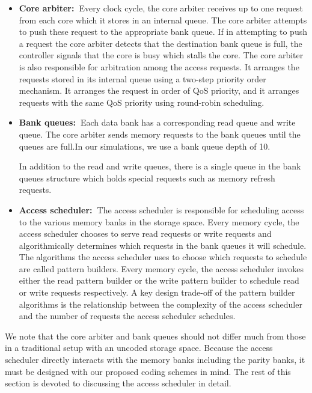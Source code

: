 \begin{itemize}
\item \textbf{Core arbiter:~}Every clock cycle, the core arbiter receives up to one request from each core which it stores in an internal queue. The core arbiter attempts to push these request to the appropriate bank queue. If in attempting to push a request the core arbiter detects that the destination bank queue is full, the controller signals that the core is busy which stalls the core. The core arbiter is also responsible for arbitration among the access requests. It arranges the requests stored in its internal queue using a two-step priority order mechanism. It arranges the request in order of QoS priority, and it arranges requests with the same QoS priority using round-robin scheduling.

\item \textbf{Bank queues:~}Each data bank has a corresponding read queue and write queue.  The core arbiter sends memory requests to the bank queues until the queues are full.In our simulations, we use a bank queue depth of 10. 

In addition to the read and write queues, there is a single queue in the bank queues structure which holds special requests such as memory refresh requests.

\item \textbf{Access scheduler:~}The access scheduler is responsible for scheduling access to the various memory banks in the storage space. Every memory cycle, the access scheduler chooses to serve read requests or write requests and algorithmically determines which requests in the bank queues it will schedule. The algorithms the access scheduler uses to choose which requests to schedule are called pattern builders. Every memory cycle, the access scheduler invokes either the read pattern builder or the write pattern builder to schedule read or write requests respectively. A key design trade-off of the pattern builder algorithms is the relationship between the complexity of the access scheduler and the number of requests the access scheduler schedules.
\end{itemize}

We note that the core arbiter and bank queues should not differ much from those in a traditional setup with an uncoded storage space. Because the access scheduler directly interacts with the memory banks including the parity banks, it must be designed with our proposed coding schemes in mind. The rest of this section is devoted to discussing the access scheduler in detail.


